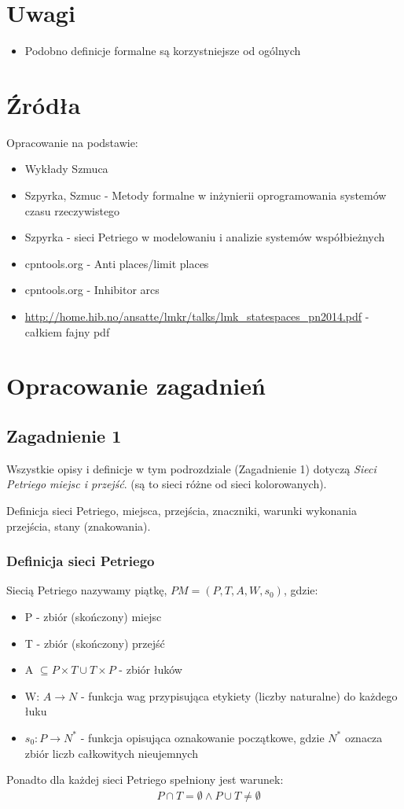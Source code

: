 \documentclass[a4paper,15pt]{article}
\newcommand{\definition}[2]{
    \begin{tcolorbox}[colback=green!5!white,colframe=mGreen,title={Definicja -  #1}]
        #2
    \end{tcolorbox}
}
\newcommand{\question}[2]{
    \begin{tcolorbox}[colback=black!5!white,colframe=black,title={Zagadnienie #1}]
        #2
    \end{tcolorbox}
}
\begin{document}
\section{Uwagi}
\begin{itemize}
\item Podobno definicje formalne są korzystniejsze od ogólnych
\end{itemize}

\section{Źródła}
Opracowanie na podstawie:
\begin{itemize}
\item Wykłady Szmuca
\item Szpyrka, Szmuc - Metody formalne w inżynierii oprogramowania systemów czasu rzeczywistego
\item Szpyrka - sieci Petriego w modelowaniu i analizie systemów współbieżnych
\item cpntools.org - Anti places/limit places
\item cpntools.org - Inhibitor arcs
\item \url{http://home.hib.no/ansatte/lmkr/talks/lmk_statespaces_pn2014.pdf} - całkiem fajny pdf
\end{itemize}


\newpage
\section{Opracowanie zagadnień}

\subsection{Zagadnienie 1}
Wszystkie opisy i definicje w tym podrozdziale (Zagadnienie 1) dotyczą \textit{Sieci Petriego miejsc i przejść}. (są to sieci różne od sieci kolorowanych).
\question{1}{
Definicja sieci Petriego, miejsca, przejścia, znaczniki, warunki
wykonania przejścia, stany (znakowania).
}

\subsubsection{Definicja sieci Petriego}
\definition{Sieć Petriego (miejsc i przejść)}{
Siecią Petriego nazywamy piątkę, $PM = (P, T, A, W, s_0)$, gdzie:
\begin{itemize}
\item P - zbiór (skończony) miejsc
\item T - zbiór (skończony) przejść
\item A $ \subseteq P \times T \cup T \times P$ - zbiór łuków
\item W: $A \rightarrow N$ - funkcja wag przypisująca etykiety (liczby naturalne) do każdego łuku
\item $s_0: P \rightarrow N^*$ - funkcja opisująca oznakowanie początkowe, gdzie $N^*$ oznacza zbiór liczb całkowitych nieujemnych
\end{itemize} 
Ponadto dla każdej sieci Petriego spełniony jest warunek:
\begin{align*}
& P \cap T = \emptyset \wedge P \cup T \neq \emptyset
\end{align*}
}
\end{document}
